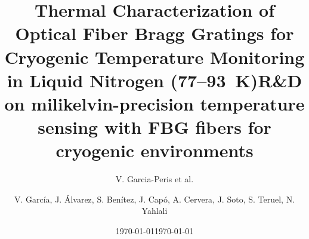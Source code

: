 \documentclass[12pt]{article}
\title{\textbf{Thermal Characterization of Optical Fiber Bragg Gratings for Cryogenic Temperature Monitoring in Liquid Nitrogen (77--93~K)}}
\author{V. Garcia-Peris et al.}
\date{\today}
\begin{document}
\begin{frontmatter}



\title{R\&D on milikelvin-precision temperature sensing with FBG fibers for cryogenic environments}






\author{ 
V. García, J. Álvarez, S. Benítez, J. Capó, A. Cervera, J. Soto, S. Teruel, N. Yahlali}






\date{\today}

\begin{abstract}


\end{abstract}
\end{frontmatter}
\end{document}
